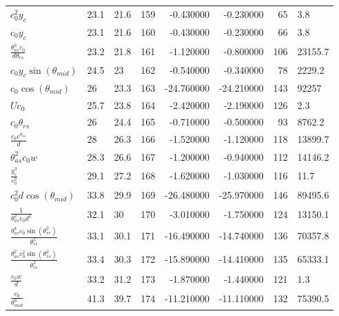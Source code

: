\begin{tabularx}{\textwidth}{lllrrrrl}
$ c_{0}^{2} y_c $  &  23.1  &  21.6  &  159  &  -0.430000  &  -0.230000  &  65  &  3.8  \\ 
$ c_{0} y_c $  &  23.1  &  21.6  &  160  &  -0.430000  &  -0.230000  &  66  &  3.8  \\ 
$ \displaystyle\frac{\theta_{as}^{3} c_{0}}{d \theta_{rs}} $  &  23.2  &  21.8  &  161  &  -1.120000  &  -0.800000  &  106  &  23155.7  \\ 
$ c_{0} y_c \sin{\left(\theta_{mid} \right)} $  &  24.5  &  23\phantom{.0}  &  162  &  -0.540000  &  -0.340000  &  78  &  2229.2  \\ 
$ c_{0} \cos{\left(\theta_{mid} \right)} $  &  26\phantom{.0}  &  23.3  &  163  &  -24.760000  &  -24.210000  &  143  &  92257\phantom{.0}  \\ 
$ U c_{0} $  &  25.7  &  23.8  &  164  &  -2.420000  &  -2.190000  &  126  &  2.3  \\ 
$ c_{0} \theta_{rs} $  &  26\phantom{.0}  &  24.4  &  165  &  -0.710000  &  -0.500000  &  93  &  8762.2  \\ 
$ \displaystyle\frac{c_{0} e^{\theta_{as}}}{d} $  &  28\phantom{.0}  &  26.3  &  166  &  -1.520000  &  -1.120000  &  118  &  13899.7  \\ 
$ \theta_{as}^{2} c_{0} w $  &  28.3  &  26.6  &  167  &  -1.200000  &  -0.940000  &  112  &  14146.2  \\ 
$ \displaystyle\frac{y_c^{3}}{c_{0}^{3}} $  &  29.1  &  27.2  &  168  &  -1.620000  &  -1.030000  &  116  &  11.7  \\ 
$ c_{0}^{2} d \cos{\left(\theta_{mid} \right)} $  &  33.8  &  29.9  &  169  &  -26.480000  &  -25.970000  &  146  &  89495.6  \\ 
$ \displaystyle\frac{1}{\theta_{as}^{2} c_{0} d^{2}} $  &  32.1  &  30\phantom{.0}  &  170  &  -3.010000  &  -1.750000  &  124  &  13150.1  \\ 
$ \displaystyle\frac{\theta_{as}^{4} c_{0} \sin{\left(\theta_{rs}^{2} \right)}}{\theta_{rs}^{2}} $  &  33.1  &  30.1  &  171  &  -16.490000  &  -14.740000  &  136  &  70357.8  \\ 
$ \displaystyle\frac{\theta_{as}^{2} c_{0}^{2} \sin{\left(\theta_{rs}^{2} \right)}}{\theta_{rs}^{2}} $  &  33.4  &  30.3  &  172  &  -15.890000  &  -14.410000  &  135  &  65333.1  \\ 
$ \displaystyle\frac{c_{0} w}{d} $  &  33.2  &  31.2  &  173  &  -1.870000  &  -1.440000  &  121  &  1.3  \\ 
$ \displaystyle\frac{c_{0}}{\theta_{mid}^{9}} $  &  41.3  &  39.7  &  174  &  -11.210000  &  -11.110000  &  132  &  75390.5  \\ 

\end{tabularx}

